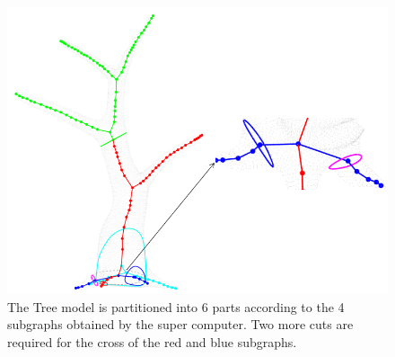 \begin{figure}[t!]
  \centering
  \includegraphics[width=0.8\linewidth]{figs/super_tree.png}
  \caption{\label{fig:limit}%
  The Tree model is partitioned into 6 parts according to the 4 subgraphs obtained by the super computer. Two more cuts are required for the cross of the red and blue subgraphs.}
\end{figure}





